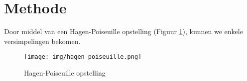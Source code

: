 \section{Methode}

Door middel van een Hagen-Poiseuille opstelling (Figuur \ref{fig:hagen-pois}), kunnen we
enkele versimpelingen bekomen.

\begin{figure}[h]
    \caption{Hagen-Poiseuille opstelling}
    \texttt{[image: img/hagen\_poiseuille.png]}
    \label{fig:hagen-pois}
\end{figure}
